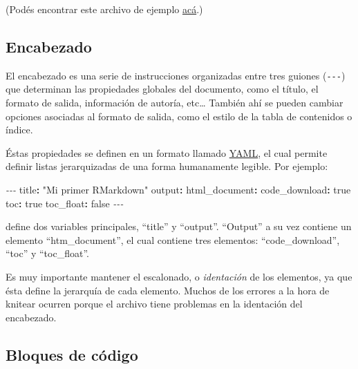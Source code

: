 \documentclass[
  openany]{book}
\newenvironment{Shaded}{\begin{snugshade}}{\end{snugshade}}
\newcommand{\AttributeTok}[1]{\textcolor[rgb]{0.77,0.63,0.00}{#1}}
\newcommand{\CharTok}[1]{\textcolor[rgb]{0.31,0.60,0.02}{#1}}
\newcommand{\FunctionTok}[1]{\textcolor[rgb]{0.00,0.00,0.00}{#1}}
\newcommand{\KeywordTok}[1]{\textcolor[rgb]{0.13,0.29,0.53}{\textbf{#1}}}
\newcommand{\PreprocessorTok}[1]{\textcolor[rgb]{0.56,0.35,0.01}{\textit{#1}}}
\newcommand{\StringTok}[1]{\textcolor[rgb]{0.31,0.60,0.02}{#1}}
\begin{document}
(Podés encontrar este archivo de ejemplo \href{files/mi-primer-rmarkdown.Rmd}{acá}.)

\hypertarget{encabezado}{%
\subsection{Encabezado}\label{encabezado}}

El encabezado es una serie de instrucciones organizadas entre tres guiones (\texttt{-\/-\/-}) que determinan las propiedades globales del documento, como el título, el formato de salida, información de autoría, etc\ldots{} También ahí se pueden cambiar opciones asociadas al formato de salida, como el estilo de la tabla de contenidos o índice.

Éstas propiedades se definen en un formato llamado \href{https://es.wikipedia.org/wiki/YAML}{YAML}, el cual permite definir listas jerarquizadas de una forma humanamente legible.
Por ejemplo:

\begin{Shaded}
\begin{Highlighting}[]
\PreprocessorTok{{-}{-}{-}}
\FunctionTok{title}\KeywordTok{:}\AttributeTok{ }\StringTok{"Mi primer RMarkdown"}
\FunctionTok{output}\KeywordTok{:}\AttributeTok{ }
\AttributeTok{  }\FunctionTok{html\_document}\KeywordTok{:}
\AttributeTok{    }\FunctionTok{code\_download}\KeywordTok{:}\AttributeTok{ }\CharTok{true}
\AttributeTok{    }\FunctionTok{toc}\KeywordTok{:}\AttributeTok{ }\CharTok{true}
\AttributeTok{    }\FunctionTok{toc\_float}\KeywordTok{:}\AttributeTok{ }\CharTok{false}
\PreprocessorTok{{-}{-}{-}}
\end{Highlighting}
\end{Shaded}

define dos variables principales, ``title'' y ``output''.
``Output'' a su vez contiene un elemento ``htm\_document'', el cual contiene tres elementos: ``code\_download'', ``toc'' y ``toc\_float''.

Es muy importante mantener el escalonado, o \emph{identación} de los elementos, ya que ésta define la jerarquía de cada elemento.
Muchos de los errores a la hora de knitear ocurren porque el archivo tiene problemas en la identación del encabezado.

\hypertarget{bloques-de-cuxf3digo}{%
\subsection{Bloques de código}\label{bloques-de-cuxf3digo}}
\end{document}
